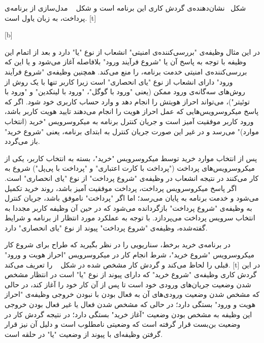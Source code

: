 شکل~ نشان‌دهنده‌ی گردش کاری این برنامه است و شکل ~ مدل‌سازی از برنامه‌ی پرداخت، به زبان یاول است.
[t]
\vspace{0.5em}


[b]
\vspace{0.5em}

در این مثال وظیفه‌ی "بررسی‌کننده‌ی امنیتی" انشعاب از نوع "یا" دارد و بعد از اتمام این وظیفه با توجه به پاسخ آن یا "شروع فرآیند ورود" بلافاصله آغاز می‌شود و یا این که بررسی‌کننده‌ی امنیتی خدمت برنامه، را منع می‌کند. همچنین وظیفه‌ی "شروع فرآیند ورود" دارای انشعاب از نوع "یای انحصاری" است زیرا کاربر تنها با یک روش از روش‌های سه‌گانه‌ی ورود ممکن (یعنی "ورود با گوگل"، "ورود با لینکدین" و "ورود با توئیتر")، می‌تواند احراز هویتش را انجام دهد و وارد حساب کاربری خود شود. اگر که پاسخ میکروسرویس‌هایی که عمل احراز هویت را انجام می‌دهند تایید هویت کاربر باشد، ورود کاربر موفقیت آمیز است و جریان کنترل برنامه به میکروسرویس "خرید (انتخاب موارد)" می‌رسد و در غیر این صورت جریان کنترل به ابتدای برنامه، یعنی "شروع خرید" باز می‌گردد.

پس از انتخاب موارد خرید توسط میکروسرویس "خرید"، بسته به انتخاب کاربر، یکی از میکروسرویس‌های پرداخت ("پرداخت با کارت اعتباری" و "پرداخت با پی‌پل") شروع به کار می‌کنند در نتیجه انشعاب در وظیفه‌ی "شروع پرداخت" از نوع "یای انحصاری" است. اگر پاسخ میکروسرویس‌ پرداخت، پرداخت موفقیت آمیز باشد، روند خرید تکمیل می‌شود و خدمت برنامه به پایان می‌رسد؛ اما اگر "پرداخت" ناموفق باشد، جریان کنترل به وظیفه‌ی "شروع پرداخت" بازگردانده می‌شود که در حین آن وظیفه کاربر مجددا به انتخاب سرویس پرداخت می‌پردازد. با توجه به عملکرد مورد انتظار از برنامه و شرایط گفته‌شده، وظیفه‌ی "شروع پرداخت" پیوند از نوع "یای انحصاری" دارد. \newline\newline



در برنامه‌ی خرید برخط، سناریویی را در نظر بگیرید که طراح برای شروع کار میکروسرویس "شروع خرید"، شرط انجام کار در میکروسرویس "احراز هویت و ورود" قبلی را لحاظ می‌کند و گردش کار مشخص شده در شکل ~ را تعریف می‌کند. 
[t]
\vspace{0.5em}
در این گردش کاری وظیفه‌ی "شروع خرید" که دارای پیوند از نوع "یا" است در انتظار مشخص شدن وضعیت جریان‌های ورودی‌ خود است تا پس از آن کار خود را آغاز کند، در حالی که مشخص شدن وضعیت ورودی‌های آن به فعال بودن با نبودن خروجی وظیفه‌ی "احراز هویت و ورود" بستگی دارد؛ در حالی که مشخص شدن فعال یا غیر فعال بودن خروجی این وظیفه به مشخص بودن وضعیت "آغاز خرید" بستگی دارد؛ در نتیجه گردش کار در وضعیت بن‌بست قرار گرفته است که وضعیتی نامطلوب است و دلیل آن نیز قرار گرفتن وظیفه‌ای با پیوند از وضعیت "یا" در حلقه است.

